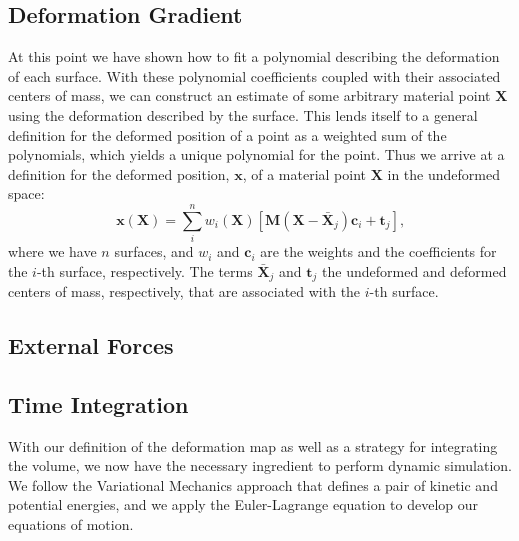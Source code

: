 \subsection{Deformation Gradient}
At this point we have shown how to fit a polynomial describing the deformation of each surface. With these polynomial coefficients coupled with their associated centers of mass, we can construct an estimate of some arbitrary material point $\mathbf{X}$ using the deformation described by the surface. This lends itself to a general definition for the deformed position of a point as a weighted sum of the polynomials, which yields a unique polynomial for the point. Thus we arrive at a definition for the deformed position, $\mathbf{x}$, of a material point $\mathbf{X}$ in the undeformed space:
\begin{equation}
\label{eqn:deformation_map}
	\mathbf{x}(\mathbf{X}) = \sum_i^n w_i(\mathbf{X}) \left[ \mathbf{M}(\mathbf{X-\bar{X}}_j)\mathbf{c}_i + \mathbf{t}_j \right]
	\text{,}
\end{equation}
where we have $n$ surfaces, and $w_i$ and $\mathbf{c}_i$ are the weights and the coefficients for the $i$-th surface, respectively. The terms $\mathbf{\bar{X}}_j$ and $\mathbf{t}_j$ the undeformed and deformed centers of mass, respectively, that are associated with the $i$-th surface.


\subsection{External Forces}

\subsection{Time Integration}
With our definition of the deformation map as well as a strategy for integrating the volume, we now have the necessary ingredient to perform dynamic simulation. We follow the Variational Mechanics approach that defines a pair of kinetic and potential energies, and we apply the Euler-Lagrange equation to develop our equations of motion.

